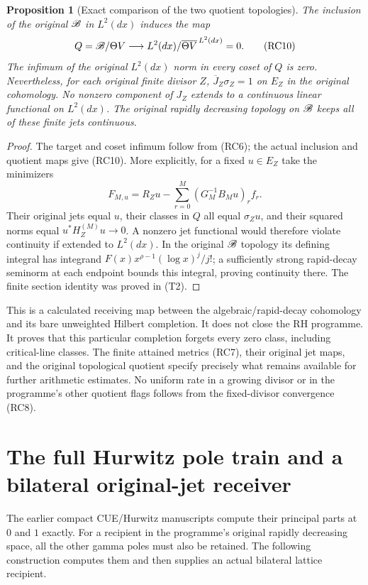\documentclass[11pt]{article}
\newtheorem{proposition}[theorem]{Proposition}
\begin{document}
\begin{proposition}[Exact comparison of the two quotient topologies]
The inclusion of the original $\mathscr B$ in $L^2(dx)$ induces the map
\[
 Q=\mathscr B/\Theta V\longrightarrow
 L^2(dx)/\overline{\Theta V}^{\,L^2(dx)}=0.
 \tag{RC10}
\]
The infimum of the original $L^2(dx)$ norm in every coset of $Q$
is zero. Nevertheless, for each original finite divisor $Z$,
$\overline J_Z\sigma_Z=1$ on $E_Z$ in the original cohomology.
No nonzero component of $J_Z$ extends to a continuous linear
functional on $L^2(dx)$. The original rapidly decreasing topology
on $\mathscr B$ keeps all of these finite jets continuous.
\end{proposition}
\begin{proof}
The target and coset infimum follow from (RC6); the actual
inclusion and quotient maps give (RC10). More explicitly, for a
fixed $u\in E_Z$ take the minimizers
\[
 F_{M,u}=R_Zu-\sum_{r=0}^M (G_M^{-1}B_Mu)_r f_r.
\]
Their original jets equal $u$, their classes in $Q$ all equal
$\sigma_Zu$, and their squared norms equal
$u^*H_Z^{(M)}u\to0$. A nonzero jet functional would therefore
violate continuity if extended to $L^2(dx)$. In the original
$\mathscr B$ topology its defining integral has integrand
$F(x)x^{\rho-1}(\log x)^j/j!$; a sufficiently strong rapid-decay
seminorm at each endpoint bounds this integral, proving continuity
there. The finite section identity was proved in (T2).
\end{proof}

This is a calculated receiving map between the algebraic/rapid-decay
cohomology and its bare unweighted Hilbert completion. It does not
close the RH programme. It proves that this particular completion
forgets every zero class, including critical-line classes. The
finite attained metrics (RC7), their original jet maps, and the
original topological quotient specify precisely what remains
available for further arithmetic estimates. No uniform rate in a
growing divisor or in the programme's other quotient flags follows
from the fixed-divisor convergence (RC8).

\section{The full Hurwitz pole train and a bilateral original-jet receiver}
The earlier compact CUE/Hurwitz manuscripts compute their principal
parts at $0$ and $1$ exactly. For a recipient in the programme's
original rapidly decreasing space, all the other gamma poles must
also be retained. The following construction computes them and
then supplies an actual bilateral lattice recipient.
\end{document}
